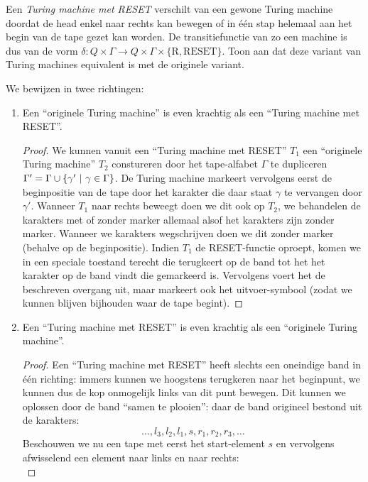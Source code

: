 \documentclass[a4paper]{article}
\begin{document}
\begin{question}
Een \emph{Turing machine met RESET} verschilt van een gewone Turing machine doordat de head enkel naar rechts kan bewegen of in \'e\'en stap helemaal aan het begin van de tape gezet kan worden. De transitiefunctie van zo een machine is dus van de vorm $\delta : Q \times \Gamma \to Q \times \Gamma \times \{ \text{R}, \text{RESET} \}$. Toon aan dat deze variant van Turing machines equivalent is met de originele variant.
\begin{answer}
We bewijzen in twee richtingen:
\begin{enumerate}
\item Een ``originele Turing machine'' is even krachtig als een ``Turing machine met RESET''.
\begin{proof}
We kunnen vanuit een ``Turing machine met RESET'' $T_1$ een ``originele Turing machine'' $T_2$ constureren door het tape-alfabet $\Gamma$ te dupliceren $\Gamma'=\Gamma\cup\left\{ \gamma'\ |\ \gamma\in\Gamma \right\}$. De Turing machine markeert vervolgens eerst de beginpositie van de tape door het karakter die daar staat $\gamma$ te vervangen door $\gamma'$. Wanneer $T_1$ naar rechts beweegt doen we dit ook op $T_2$, we behandelen de karakters met of zonder marker allemaal alsof het karakters zijn zonder marker. Wanneer we karakters wegschrijven doen we dit zonder marker (behalve op de beginpositie). Indien $T_1$ de RESET-functie oproept, komen we in een speciale toestand terecht die terugkeert op de band tot het het karakter op de band vindt die gemarkeerd is. Vervolgens voert het de beschreven overgang uit, maar markeert ook het uitvoer-symbool (zodat we kunnen blijven bijhouden waar de tape begint).
\end{proof}
\item Een ``Turing machine met RESET'' is even krachtig als een ``originele Turing machine''.
\begin{proof}
Een ``Turing machine met RESET'' heeft slechts een oneindige band in \'e\'en richting: immers kunnen we hoogstens terugkeren naar het beginpunt, we kunnen dus de kop onmogelijk links van dit punt bewegen. Dit kunnen we oplossen door de band ``samen te plooien'': daar de band origineel bestond uit de karakters:
\begin{equation}
\ldots,l_3,l_2,l_1,s,r_1,r_2,r_3,\ldots
\end{equation}
Beschouwen we nu een tape met eerst het start-element $s$ en vervolgens afwisselend een element naar links en naar rechts:
\begin{equation}

\end{equation}
\end{proof}
\end{enumerate}
\end{answer}
\end{question}
\end{document}
